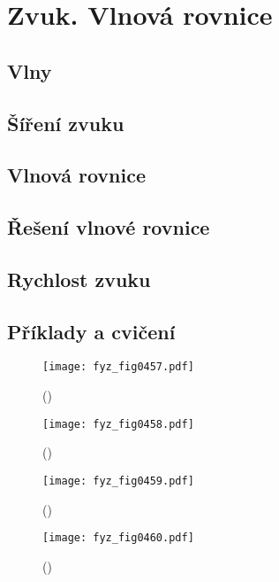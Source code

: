 \setchaptertoc
\chapter{Zvuk. Vlnová rovnice}\label{fyz:IchapXLVII}

  \section{Vlny}\label{fyz:IchapXLVIIsecI}
  \section{Šíření zvuku}\label{fyz:IchapXLVIIsecII}
  \section{Vlnová rovnice}\label{fyz:IchapXLVIIsecIII}
  \section{Řešení vlnové rovnice}\label{fyz:IchapXLVIIsecIV}
  \section{Rychlost zvuku}\label{fyz:IchapXLVIIsecV}
  \section{Příklady a cvičení}\label{fyz:IchapXLVIIsecVI}

    \begin{figure}[ht!] %
      \centering
      \texttt{[image: fyz\_fig0457.pdf]}
      \caption{ 
               (\cite[s.~707]{Feynman01})}
      \label{fyz:fig0457}
    \end{figure}

    \begin{figure}[ht!] %
      \centering
      \texttt{[image: fyz\_fig0458.pdf]}
      \caption{ 
               (\cite[s.~707]{Feynman01})}
      \label{fyz:fig0458}
    \end{figure}

    \begin{figure}[ht!] %
      \centering
      \texttt{[image: fyz\_fig0459.pdf]}
      \caption{ 
               (\cite[s.~707]{Feynman01})}
      \label{fyz:fig0459}
    \end{figure}

    \begin{figure}[ht!] %
      \centering
      \texttt{[image: fyz\_fig0460.pdf]}
      \caption{ 
               (\cite[s.~707]{Feynman01})}
      \label{fyz:fig0460}
    \end{figure}
    
